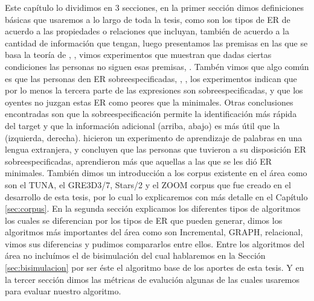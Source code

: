 Este cap\'itulo lo dividimos en 3 secciones, en la primer secci\'on dimos definiciones b\'asicas que usaremos a lo largo de toda la tesis, como son los tipos de ER de acuerdo a las propiedades o relaciones que incluyan, tambi\'en de acuerdo a la cantidad de informaci\'on que tengan, luego presentamos las premisas en las que se basa la teor\'ia de \cite{clark1992arenas}, \cite{Clark-Marshall81}, vimos experimentos que muestran que dadas ciertas condiciones las personas no siguen esas premisas, \cite{keysar:Curr98}. Tamb\'en vimos que algo com\'un es que las personas den ER sobreespecificadas, \cite{arts}, \cite{do-speakers}, los experimentos indican que por lo menos la tercera parte de las expresiones son sobreespecificadas, y que los oyentes no juzgan estas ER como peores que la minimales. Otras conclusiones encontradas son que la sobreespecificaci\'on permite la identificaci\'on m\'as r\'apida del target y que la informaci\'on adicional (arriba, abajo) es m\'as \'util que la (izquierda, derecha). \cite{Lu_sasha2015} hicieron un experimento de aprendizaje de palabras en una lengua extranjera, y concluyen que las personas que tuvieron a su disposici\'on ER sobreespecificadas, aprendieron m\'as que aquellas a las que se les di\'o ER minimales. Tambi\'en dimos un introducci\'on a los corpus existente en el \'area como son el TUNA, el GRE3D3/7, Stars/2 y el ZOOM corpus que fue creado en el desarrollo de esta tesis, por lo cual lo explicaremos con m\'as detalle en el Cap\'itulo \ref{sec:corpus}. En la segunda secci\'on explicamos los diferentes tipos de algoritmos los cuales se diferencian por los tipos de ER que pueden generar, dimos los algoritmos m\'as importantes del \'area como son Incremental, GRAPH, relacional, vimos sus diferencias y pudimos compararlos entre ellos. Entre los algoritmos del \'area no inclu\'imos el de bisimulaci\'on del cual hablaremos en la Secci\'on \ref{sec:bisimulacion} por ser \'este el algoritmo base de los aportes de esta tesis. Y en la tercer secci\'on dimos las m\'etricas de evaluci\'on algunas de las cuales usaremos para evaluar nuestro algoritmo.

